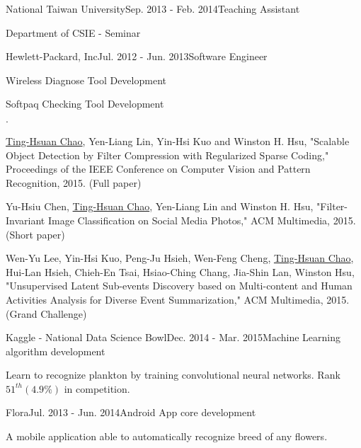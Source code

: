 \documentclass{joel_cv}
\begin{document}
\begin{sectionContentNormal}{National Taiwan University}{Sep. 2013 - Feb. 2014}{Teaching Assistant}
	\item Department of CSIE - Seminar
\end{sectionContentNormal}

\begin{sectionContentNormal}{Hewlett-Packard, Inc}{Jul. 2012 - Jun. 2013}{Software Engineer}
	\item Wireless Diagnose Tool Development
	\item Softpaq Checking Tool Development
\end{sectionContentNormal}

%
%

\begin{sectionItemize}{$\cdot$}
	\item \underline{Ting-Hsuan Chao}, Yen-Liang Lin, Yin-Hsi Kuo and Winston H. Hsu, "Scalable Object Detection by Filter Compression with Regularized Sparse Coding," Proceedings of the IEEE Conference on Computer Vision and Pattern Recognition, 2015. (Full paper)
	\item Yu-Hsiu Chen, \underline{Ting-Hsuan Chao},  Yen-Liang Lin and Winston H. Hsu, "Filter-Invariant Image Classification on Social Media Photos," ACM Multimedia, 2015. (Short paper)
	\item Wen-Yu Lee, Yin-Hsi Kuo, Peng-Ju Hsieh, Wen-Feng Cheng, \underline{Ting-Hsuan Chao}, Hui-Lan Hsieh, Chieh-En Tsai, Hsiao-Ching Chang, Jia-Shin Lan, Winston Hsu, "Unsupervised Latent Sub-events Discovery based on Multi-content and Human Activities Analysis for Diverse Event Summarization,"  ACM Multimedia, 2015. (Grand Challenge)
\end{sectionItemize}

\pagebreak


%
%


\begin{sectionContentNormal}{Kaggle - National Data Science Bowl}{Dec. 2014 - Mar. 2015}{Machine Learning algorithm development}
	\item Learn to recognize plankton by training convolutional neural networks. Rank $51^{th} (4.9\%)$ in competition.
\end{sectionContentNormal}

\begin{sectionContentNormal}{Flora}{Jul. 2013 - Jun. 2014}{Android App core development}
	\item A mobile application able to automatically recognize breed of any flowers.
\end{sectionContentNormal}
\end{document}
